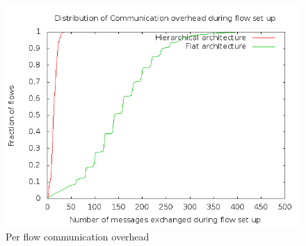\documentclass[portrait,a1]{a0poster}
\begin{document}
\begin{multicols}{2}
\begin{figure}[H]
\centering
\includegraphics[scale=01]{msg}
\caption{Per flow communication overhead}
\label{fig:msg}
\end{figure}





\end{multicols}
\end{document}
